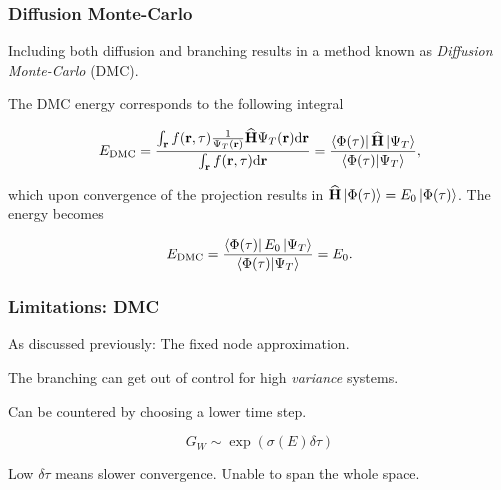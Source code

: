 %  
%  
%  
%  
%  
% 
%  
%  

\begin{frame}
\frametitle{Diffusion Monte-Carlo}
Including both diffusion and branching results in a method known as \textit{Diffusion Monte-Carlo} (DMC).
\shift

The DMC energy corresponds to the following integral

\begin{equation}
 E_{\mathrm{DMC}} = \frac{\int_\mathbf{r} f(\mathbf{r}, \tau) \frac{1}{\Psi_T(\mathbf{r})}{\bf\widehat{H}} \Psi_T(\mathbf{r})\mathrm{d}\mathbf{r}}{\int_\mathbf{r} f(\mathbf{r}, \tau)\mathrm{d}\mathbf{r}}  = \frac{\left< \Phi(\tau) \right| {\bf\widehat{H}} \left| \Psi_T \right>}{\left\langle \Phi(\tau) | \Psi_T\right\rangle},
\end{equation}

\pause
which upon convergence of the projection results in ${\bf\widehat{H}}\left| \Phi(\tau) \right> = E_0\left| \Phi(\tau) \right>$. The energy becomes

\begin{equation}
 E_{\mathrm{DMC}} = \frac{\left< \Phi(\tau) \right|E_0\left| \Psi_T \right>}{\left\langle \Phi(\tau) | \Psi_T\right\rangle} = E_0.
\end{equation}

\end{frame}




\begin{frame}
  \frametitle{Limitations: DMC}
  
  As discussed previously: The fixed node approximation.
  \shift
  
  The branching can get out of control for high \textit{variance} systems. 
  \shift
  
  Can be countered by choosing a lower time step. 
  
  \begin{equation}
   G_W \sim \exp(\sigma(E)\delta\tau)
  \end{equation}
  \shift
  
  Low $\delta\tau$ means slower convergence. Unable to span the whole space.
  
\end{frame}

